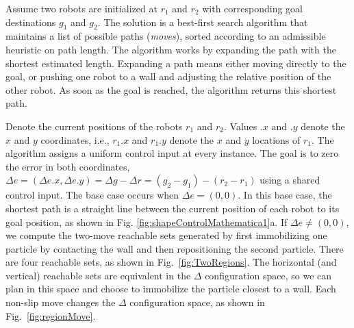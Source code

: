 Assume two robots are initialized at $r_1$ and $r_2$ with corresponding goal destinations $g_1$ and $g_2$. 
The solution is a best-first search algorithm that maintains a list of possible paths (\emph{moves}), sorted according to an admissible heuristic on path length.
The algorithm works by expanding the path with the shortest estimated length.
Expanding a path means either moving directly to the goal, or pushing one robot to a wall and adjusting the relative position of the other robot.
As soon as the goal is reached, the algorithm returns this shortest path.

Denote the current positions of the robots  $r_1$ and $r_2$. 
Values $.x$ and $.y$ denote the $x$ and $y$ coordinates, i.e., $r_1.x$ and $r_1.y$ denote the $x$ and $y$ locations of $r_1$. 
The algorithm assigns a uniform control input at every instance.
The goal is to zero the error in both coordinates,
 $\Delta e =(\Delta e.x, \Delta e.y) =\Delta g - \Delta r = (g_2-g_1)- (r_2-r_1)$ using a shared control input. 
 The base case occurs when $\Delta e = (0,0)$. In this base case, the shortest path is a straight line between the current position of each robot to its goal position, as shown in Fig. \ref{fig:shapeControlMathematica1}a.  
If  $\Delta e\neq (0,0)$, we compute the two-move reachable sets generated by first immobilizing one particle by contacting the wall and then repositioning the second particle.
There are four reachable sets, as shown in Fig.~\ref{fig:TwoRegions}.
The horizontal (and vertical) reachable sets are equivalent in the  $\Delta$ configuration space, so we can plan in this space and choose to immobilize the particle closest to a wall. 
Each non-slip move changes the $\Delta$ configuration space, as shown in  Fig.~\ref{fig:regionMove}.
   


